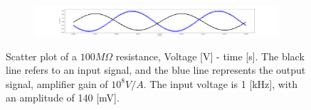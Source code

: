 \documentclass{article}
\begin{document}
\begin{figure}[H]
    \centering
    \begin{subfigure}[b]{14cm}
        \centering
        \includegraphics[width=14cm]{./figs/V-t plot sine 140 [mV] 1 [kHz].png}
        \caption{}
    \end{subfigure}
    \hfill
    \caption{
        Scatter plot of a $100M \Omega$ resistance, Voltage [V] - time [s].
        The black line refers to an input signal, and the blue line represents the output signal, amplifier gain of $10^8 V/A$.
        The input voltage is 1 [kHz], with an amplitude of 140 [mV].
    }
    \label{fig: lock-in detection}
\end{figure}
\end{document}
